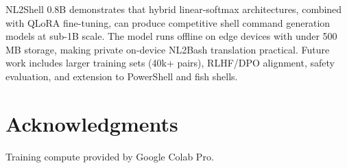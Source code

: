 \documentclass[11pt,a4paper]{article}
\begin{document}
NL2Shell 0.8B demonstrates that hybrid linear-softmax architectures, combined with QLoRA fine-tuning, can produce competitive shell command generation models at sub-1B scale.
The model runs offline on edge devices with under 500\,MB storage, making private on-device NL2Bash translation practical.
Future work includes larger training sets (40k+ pairs), RLHF/DPO alignment, safety evaluation, and extension to PowerShell and fish shells.

\section*{Acknowledgments}
Training compute provided by Google Colab Pro.



\end{document}
